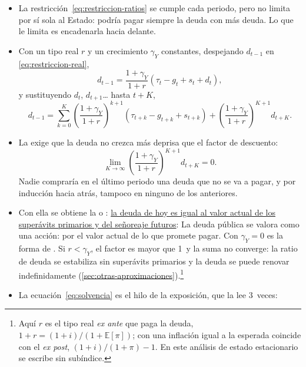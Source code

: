 \documentclass[11pt]{article}
\begin{document}
\begin{itemize}
\item La restricción~\eqref{eq:restriccion-ratios} se cumple cada periodo, pero no limita por sí sola al Estado: podría pagar siempre la deuda con más deuda. Lo que le limita es encadenarla hacia delante.
\item Con un tipo real $r$ y un crecimiento $\gamma_Y$ constantes, despejando $d_{t-1}$ en \eqref{eq:restriccion-real},
  \begin{equation*}
  d_{t-1}=\frac{1+\gamma_Y}{1+r}\left(\tau_t-g_t+s_t+d_t\right),
  \end{equation*}
  y sustituyendo $d_t$, $d_{t+1}$\ldots{} hasta $t+K$,
  \begin{equation*}
  d_{t-1}=\sum_{k=0}^{K}\left(\frac{1+\gamma_Y}{1+r}\right)^{k+1}\left(\tau_{t+k}-g_{t+k}+s_{t+k}\right)+\left(\frac{1+\gamma_Y}{1+r}\right)^{K+1}d_{t+K}.
  \end{equation*}
\item La  exige que la deuda no crezca más deprisa que el factor de descuento:
  \begin{equation*}
  \lim_{K\to\infty}\left(\frac{1+\gamma_Y}{1+r}\right)^{K+1}d_{t+K}=0 .
  \end{equation*}
  Nadie compraría en el último periodo una deuda que no se va a pagar, y por inducción hacia atrás, tampoco en ninguno de los anteriores.
\item Con ella se obtiene la  o : \uline{la deuda de hoy es igual al valor actual de los superávits primarios y del señoreaje futuros}\nocite{Walsh2017Monetary}:
  La deuda pública se valora como una acción: por el valor actual de lo que promete pagar. Con $\gamma_Y=0$ es la forma de \textcite[cap.~4]{Walsh2017Monetary}. Si $r<\gamma_Y$, el factor es mayor que 1~y la suma no converge: la ratio de deuda se estabiliza sin superávits primarios y la deuda se puede renovar indefinidamente (\ref{sec:otras-aproximaciones}).\footnote{Aquí $r$ es el tipo real \emph{ex ante} que paga la deuda, $1+r=(1+i)/(1+\mathbb{E}[\pi])$; con una inflación igual a la esperada coincide con el \emph{ex post}, $(1+i)/(1+\pi)-1$. En este análisis de estado estacionario se escribe sin subíndice.}
\item La ecuación~\eqref{eq:solvencia} es el hilo de la exposición, que la lee 3~veces:

\end{itemize}
\end{document}
